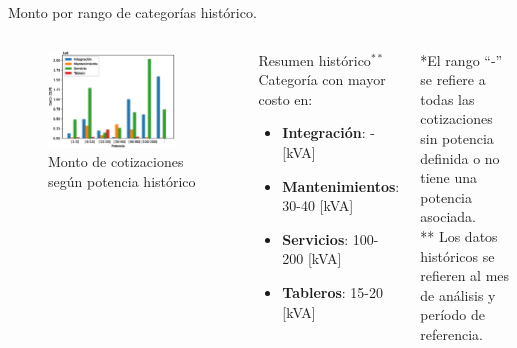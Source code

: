 \documentclass[aspectratio=169,xcolor=dvipsnames]{beamer}
\begin{document}

\begin{frame}{Monto por rango de categorías histórico.}

\begin{columns}[c]
\begin{figure}
     \includegraphics[width=0.85\textwidth]{EPS/potencia_costo_historico.eps}
     \caption{Monto de cotizaciones según potencia histórico}
     \label{graph:potencia_costo_historico}
\end{figure}
 \begin{block}{Resumen histórico$^{**}$}
    Categoría con mayor costo en:
     \begin{itemize}
         \item \textbf{Integración}: - [kVA]
         \item \textbf{Mantenimientos}: 30-40 [kVA]
         \item \textbf{Servicios}: 100-200 [kVA]
         \item \textbf{Tableros}: 15-20 [kVA]
     \end{itemize}
\end{block}
\begin{block}{}
    \tiny{*El rango ``-'' se refiere a todas las cotizaciones sin potencia definida o no tiene una potencia asociada.\\
    ** Los datos históricos se refieren al mes de análisis y período de referencia.}
\end{block} 
\end{columns}
    
\end{frame}
\end{document}
